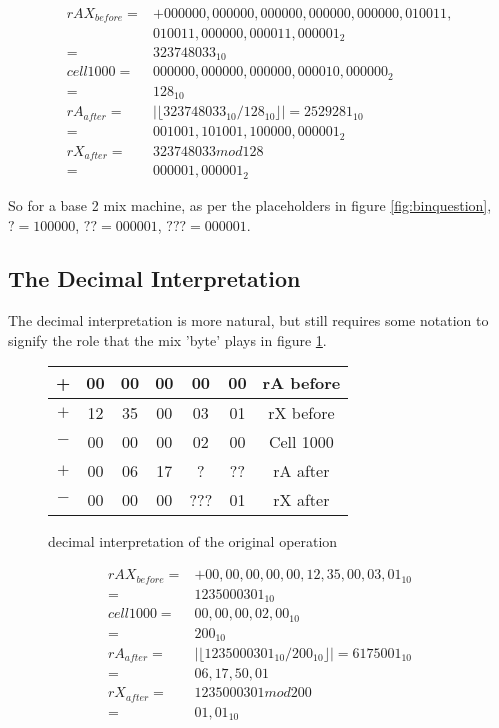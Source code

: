 \documentclass{article}
\begin{document}
\begin{align*}
    rAX_{before} = &+000000,000000,000000,000000,000000,010011,\\
    &010011,000000,000011,000001_2 \\
    = &323748033_{10} \\
    cell1000 = &000000,000000,000000,000010,000000_2 \\
    = &128_{10} \\
    rA_{after} = &| \lfloor 323748033_{10} / 128_{10} \rfloor | = 2529281_{10} \\
    = & 001001,101001,100000,000001_2 \\
    rX_{after} = &323748033 mod 128 \\
    = & 000001,000001_2
\end{align*}

So for a base 2 mix machine, as per the placeholders in
figure \ref{fig:binquestion}, $? = 100000$, $?? = 000001$,
$??? = 000001$.

\subsection*{The Decimal Interpretation}

The decimal interpretation is more natural, but still requires
some notation to signify the role that the mix 'byte' plays
in figure \ref{fig:decquestion}.

\begin{figure}
    \vspace*{1em}
        \begin{tabular}{|c|c|c|c|c|c|c|}
            \hline
            + & 00 & 00 & 00 & 00 & 00 & rA before \\
            \hline
            $+$ & 12 & 35 & 00 & 03 & 01 & rX before \\
            \hline
            $-$ & 00 & 00 & 00 & 02 & 00 & Cell 1000 \\
            \hline
            $+$ & 00 & 06 & 17 & ? & ?? & rA after \\
            \hline
            $-$ & 00 & 00 & 00 & ??? & 01 & rX after \\
            \hline
        \end{tabular}
    \vspace*{1em}
    \caption{decimal interpretation of the original operation}
    \label{fig:decquestion}
\end{figure}

\begin{align*}
    rAX_{before} = &+00,00,00,00,00,12,35,00,03,01_{10} \\
    = &1235000301_{10} \\
    cell1000 = &00,00,00,02,00_{10} \\
    = &200_{10} \\
    rA_{after} = &| \lfloor 1235000301_{10} / 200_{10} \rfloor | = 6175001_{10} \\
    = & 06,17,50,01 \\
    rX_{after} = &1235000301 mod 200 \\
    = & 01,01_{10}
\end{align*}
\end{document}
